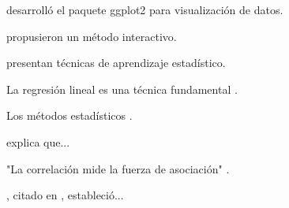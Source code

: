 

\textcite{wickham2016} desarrolló el paquete ggplot2 para visualización de datos.

\textcite{henderson1981} propusieron un método interactivo.

\textcite{james2013} presentan técnicas de aprendizaje estadístico.


La regresión lineal es una técnica fundamental \parencite{montgomery2012}.

Los métodos estadísticos \parencite{james2013, montgomery2012, kutner2005}.


\textcite[p.~45]{montgomery2012} explica que...

"La correlación mide la fuerza de asociación" \parencite[p.~123]{cohen2003}.

\parencite[pp.~25-30]{james2013}


\textcite{pearson1896}, citado en \textcite{cohen2003}, estableció...

